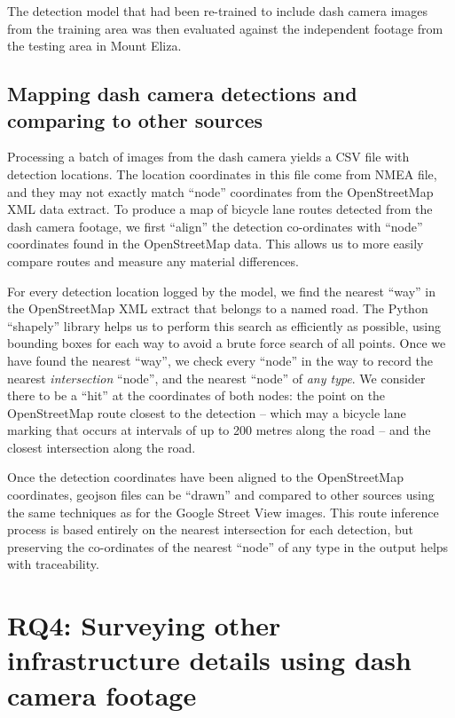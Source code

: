 \documentclass[11pt,twoside]{report}
\begin{document}
The detection model that had been re-trained to include dash camera images from the training area was then evaluated against the independent footage from the testing area in Mount Eliza.


\subsection{Mapping dash camera detections and comparing to other sources}
\label{s:rq3d}

Processing a batch of images from the dash camera yields a CSV file with detection locations.  The location coordinates in this file come from NMEA file, and they may not exactly match ``node'' coordinates from the OpenStreetMap XML data extract.  To produce a map of bicycle lane routes detected from the dash camera footage, we first ``align'' the detection co-ordinates with ``node'' coordinates found in the OpenStreetMap data.  This allows us to more easily compare routes and measure any material differences.

For every detection location logged by the model, we find the nearest ``way'' in the OpenStreetMap XML extract that belongs to a named road.  The Python ``shapely'' library helps us to perform this search as efficiently as possible, using bounding boxes for each way to avoid a brute force search of all points.  Once we have found the nearest ``way'', we check every ``node'' in the way to record the nearest \textit{intersection} ``node'', and the nearest ``node'' of \textit{any type}.  We consider there to be a ``hit'' at the coordinates of both nodes:  the point on the OpenStreetMap route closest to the detection -- which may a bicycle lane marking that occurs at intervals of up to 200 metres along the road \cite{standards} -- and the closest intersection along the road.

Once the detection coordinates have been aligned to the OpenStreetMap coordinates, geojson files can be ``drawn'' and compared to other sources using the same techniques as for the Google Street View images.  This route inference process is based entirely on the nearest intersection for each detection, but preserving the co-ordinates of the nearest ``node'' of any type in the output helps with traceability.


\section{RQ4: Surveying other infrastructure details using dash camera footage}
\end{document}
